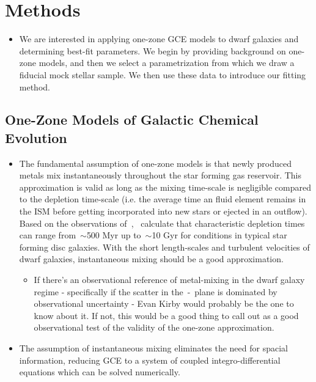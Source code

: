 \documentclass[ms.tex]{subfiles}
\begin{document}
\section{Methods}
\label{sec:methods}

\begin{itemize}

	\item We are interested in applying one-zone GCE models to dwarf galaxies
	and determining best-fit parameters.
	We begin by providing background on one-zone models, and then we select
	a parametrization from which we draw a fiducial mock stellar sample.
	We then use these data to introduce our fitting method.

\end{itemize}

\subsection{One-Zone Models of Galactic Chemical Evolution}
\label{sec:methods:onezone}

\begin{itemize}

	\item The fundamental assumption of one-zone models is that newly produced
	metals mix instantaneously throughout the star forming gas reservoir.
	This approximation is valid as long as the mixing time-scale is negligible
	compared to the depletion time-scale (i.e. the average time an fluid
	element remains in the ISM before getting incorporated into new stars or
	ejected in an outflow).
	Based on the observations of~\citet{Leroy2008},~\citet*{Weinberg2017}
	calculate that characteristic depletion times can range from~$\sim$500 Myr
	up to~$\sim$10 Gyr for conditions in typical star forming disc galaxies.
	With the short length-scales and turbulent velocities of dwarf galaxies,
	instantaneous mixing should be a good approximation.

	\begin{itemize}
		\item {\color{red}
		If there's an observational reference of metal-mixing in the dwarf
		galaxy regime - specifically if the scatter in the~\afe-\feh~plane is
		dominated by observational uncertainty - Evan Kirby would probably be
		the one to know about it.
		If not, this would be a good thing to call out as a good observational
		test of the validity of the one-zone approximation.
		}
	\end{itemize}

	\item The assumption of instantaneous mixing eliminates the need for
	spacial information, reducing GCE to a system of coupled
	integro-differential equations which can be solved numerically.

\end{itemize}
\end{document}
